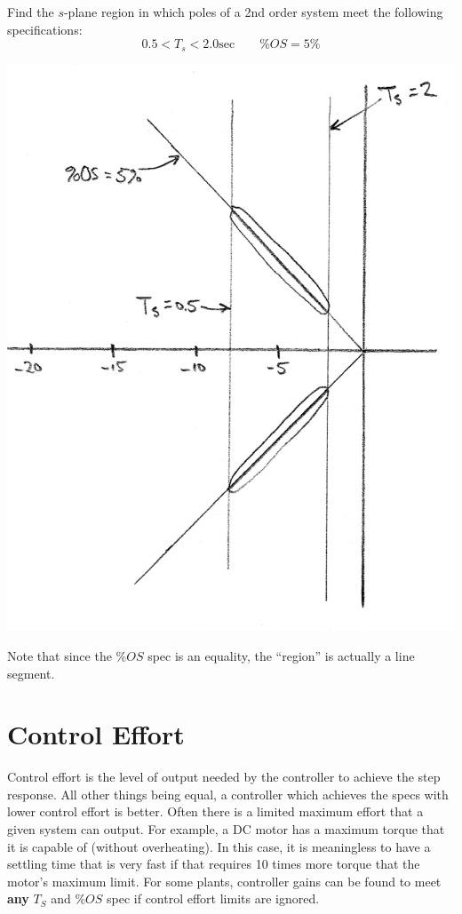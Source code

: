 \begin{ExampleSmall}
Find the $s$-plane region in which poles of a 2nd order system meet the following specifications:
\[
0.5 < T_s < 2.0 \mathrm{sec} \qquad \%OS = 5\%
\]

\includegraphics[width=3.in]{figs09/00791a.png}

Note that since the $\%OS$ spec is an equality, the ``region'' is actually a line segment.

\end{ExampleSmall}






\section{Control Effort}\label{CtlEff}


Control effort is the level of output needed by the controller to achieve the step response.
All other things being equal, a controller which achieves the specs with lower control effort is better.
Often there is a limited maximum effort that a given system can output.
For example, a DC motor has a maximum torque that it is capable of (without overheating).
In this case, it is meaningless to have
a settling time that is very fast if that requires 10 times more torque that the motor's maximum limit.
For some plants, controller gains can be found to meet {\bf any} $T_S$ and $\%OS$ spec if control
effort limits are ignored.

